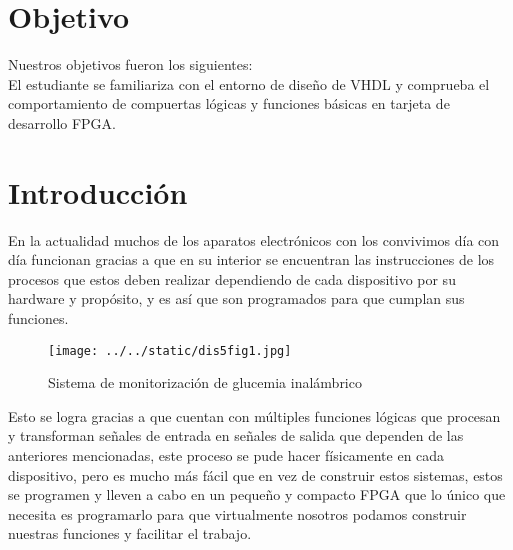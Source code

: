 \documentclass{article}
\begin{document}
\begin{abstract}
	\begin{justify}
	Se diseño en una tarjeta de desarrollo FPGADE10
  los siguientes diseños de hardware
  programados en VHDL con ayuda del software Quartus;
	la compuerta AND, OR, NAND y XOR y la función booleana F = x + y'z,
   donde realizamos sus tablas de verdad para comprobar los resultados que nos daba 
	 el led que encendía cuando la función es verdadera o en otras palabras, {\it que de "1"}, ver resultados obtenidos (\ref{sec:resObtenidos}).\\
	\end{justify}
{\it Keywords:}  tablas de verdad, diseño  
\end{abstract}
\begin{multicols}{2}
\section{Objetivo}\label{Objetivo}
\begin{justify}
	Nuestros objetivos fueron los siguientes:
	\\ El estudiante se familiariza con el entorno de diseño de VHDL y comprueba el comportamiento de compuertas lógicas y funciones básicas en tarjeta de desarrollo FPGA.
\end{justify}	
\section{Introducción}\label{sec:intro}
\begin{justify}
	En la actualidad muchos de los aparatos electrónicos con los convivimos día con día funcionan gracias a que en su interior se encuentran las instrucciones de los procesos que estos deben realizar dependiendo de cada dispositivo por su hardware y propósito, y es así que son programados para que cumplan sus funciones.
	\begin{figure}[H]
		\centering
		\texttt{[image: ../../static/dis5fig1.jpg]}
		\caption{Sistema de monitorización de glucemia inalámbrico}
		\label{fig:1}
	\end{figure}
  Esto se logra gracias a que cuentan con múltiples funciones lógicas que procesan y transforman señales de entrada en señales de salida que dependen de las anteriores  mencionadas, este proceso se pude hacer físicamente en cada dispositivo, pero es mucho más fácil que  en vez de construir estos sistemas, estos se programen y lleven a cabo en un pequeño y compacto FPGA que lo único que necesita es programarlo para que virtualmente nosotros podamos construir nuestras funciones y facilitar el trabajo.
\end{justify}


\end{multicols}
\end{document}
